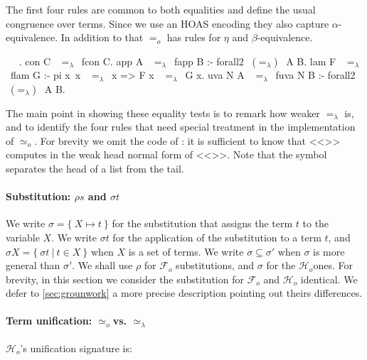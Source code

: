 \documentclass[sigconf,natbib=false,review]{acmart}
\newcommand{\EqualRel}{\ensuremath{=}}
\newcommand{\UnifRel}{\ensuremath{\simeq}}
\newcommand{\Uo}{\texorpdfstring{\ensuremath{\UnifRel_o}\xspace}{unif\_o}}
\newcommand{\Eo}{\ensuremath{\EqualRel_o}\xspace}
\newcommand{\Ue}{\ensuremath{\UnifRel_\lambda}\xspace}
\newcommand{\Ee}{\ensuremath{\EqualRel_\lambda}\xspace}
\newcommand{\Fo}{\texorpdfstring{\ensuremath{\mathcal{F}_{\!o}\xspace}}{Fo}} %
\newcommand{\Ho}{\texorpdfstring{\ensuremath{\mathcal{H}_o}\xspace}{Ho}}
\begin{document}
The first four rules are common to both equalities
and define the usual congruence over terms. Since
we use an HOAS encoding they also capture $\alpha$-equivalence.
In addition to that \Eo has rules for $\eta$ and $\beta$-equivalence.



\begin{elpicode}
  ~ \PYG{n+nf}{(\Ee)} ~.
  con C ~\Ee~fcon C.
  app A ~\Ee~fapp B :- forall2 ~(\Ee)~ A B.
  lam F ~\Ee~flam G :- pi x\ x ~\Ee~x => F x ~\Ee~G x.
  uva N A ~\Ee~fuva N B :- forall2 ~(\Ee)~ A B.
\end{elpicode}

\noindent
The main point in showing these equality tests is to remark how
weaker \Ee is, and to identify the four rules that need special
treatment in the implementation of \Uo.
For brevity we omit the code of :
it is sufficient to know that <<>> computes in  the
weak head normal form of <<>>.
Note that the symbol \elpiIn{|} separates the head of a list from the tail.

\paragraph{Substitution: $\rho s$ and $\sigma t$}

We write $\sigma = \{~ X \mapsto t ~\}$ for the substitution that assigns
the term $t$ to the variable $X$.
We write $\sigma t$ for the application of
the substitution to a term $t$, and $\sigma X = \{~ \sigma t ~|~ t \in X ~\}$ when
$X$ is a set of terms.
We write $\sigma \subseteq \sigma'$ when $\sigma$ is more
general than $\sigma'$.
We shall use $\rho$ for \Fo{} substitutions,
and $\sigma$ for the \Ho ones.
For brevity, in this section we consider
the substitution for \Fo{} and \Ho{} identical.
We defer to \cref{sec:grounwork} a more precise description
pointing out theirs differences.

\paragraph{Term unification: \Uo vs. \Ue}

\Ho{}'s unification signature is:
\end{document}
